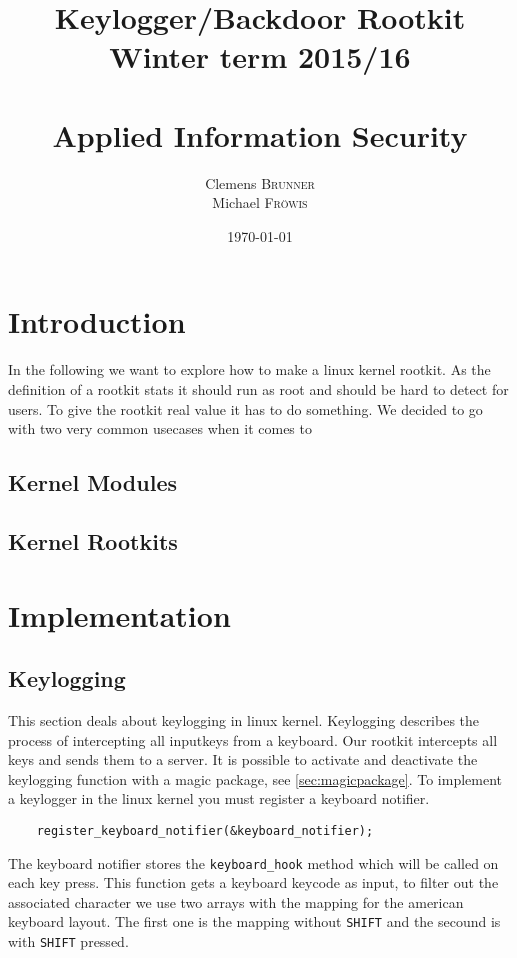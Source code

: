 \documentclass[12pt]{article}
\title{\huge{Keylogger/Backdoor Rootkit} \\\large{Winter term 2015/16} \\\quad \\\huge{Applied Information Security}}
\author{Clemens \textsc{Brunner}\\
        Michael \textsc{Fröwis}} %
\date{\today} %
\begin{document}
\maketitle %
\thispagestyle{empty}
\newpage
\tableofcontents
\thispagestyle{empty}

\newpage

\section{Introduction}

In the following we want to explore how to make a linux kernel rootkit. As the definition of a rootkit stats it should run as root and should be hard to detect for users. To give the rootkit real value it has to do something. We decided to go with two very common usecases when it comes to 


\subsection{Kernel Modules}

\subsection{Kernel Rootkits}

\section{Implementation}
\subsection{Keylogging}
This section deals about keylogging in linux kernel. Keylogging describes the process of intercepting all inputkeys from a keyboard. Our rootkit intercepts all keys and sends them to a server. It is possible to activate and deactivate the keylogging function with a magic package, see \ref{sec:magicpackage}. 
To implement a keylogger in the linux kernel you must register a keyboard notifier.

\begin{lstlisting}
	register_keyboard_notifier(&keyboard_notifier);
\end{lstlisting}

The keyboard notifier stores the \lstinline{keyboard_hook} method which will be called on each key press. This function gets a keyboard keycode as input, to filter out the associated character we use two arrays with the mapping for the american keyboard layout. The first one is the mapping without \lstinline{SHIFT} and the secound is with \lstinline{SHIFT} pressed.
\end{document}
